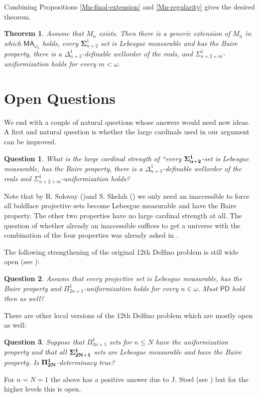\documentclass[a4paper,11pt]{article}
\newtheorem{theorem}{Theorem}[section]
\newtheorem{question}{Question}
\newcommand{\MA}{\mathsf{MA_{\omega_1}}}
\newcommand{\PD}{\mathsf{PD}}
\begin{document}
Combining Propositions \ref{Mn-final-extension} and \ref{Mn-regularity} gives
the desired theorem.

\begin{theorem}
Assume that $M_n$ exists. Then there is a generic extension of $M_n$ in which
$\MA$ holds, every $\boldsymbol{\Sigma}^1_{n+2}$ set is Lebesgue measurable
and has the Baire property, there is a $\Delta^1_{n+3}$-definable wellorder
of the reals, and $\Sigma^1_{n+2+m}$-uniformization holds for every
$m<\omega$.
\end{theorem}

\section{Open Questions}

We end with a couple of natural questions whose answers would need new ideas. A first and natural question is whether the large cardinals used in our argument can be improved. 
\begin{question}
    What is the large cardinal strength of ``every $\bf{\Sigma}^1_{n+2}$-set is Lebesgue measurable, has the Baire property, there is a $\Delta_{n+3}^1$-definable wellorder of the reals and $\Sigma^1_{n+2+m}$-uniformization holds?
\end{question}
Note that by R. Solovay (\cite{solovay1970model})and S. Shelah (\cite{shelah1984can}) we only need an inaccessible to force all boldface projective sets become Lebesgue measurable and have the Baire property. The other two properties have no large cardinal strength at all. The question of whether already an inaccessible suffices to get a universe with the combination of the four properties was already asked in \cite{friedman2003universally}.

The following strengthening of the original 12th Delfino problem is still wide open (see \cite{caicedo2020fourteen}):
\begin{question}
    Assume that every projective set is Lebesgue measurable, has the Baire property and $\Pi^1_{2n+1}$-uniformization holds for every $n \in \omega$. Must $\PD$ hold then as well?
\end{question}

There are other local versions of the 12th Delfino problem which are mostly open as well:
\begin{question}
    Suppose that  $\Pi^1_{2n+1}$ sets for $n \le N$ have the uniformization property and that all $\bf{\Sigma}^1_{2N+1}$ sets are Lebesgue measurable and have the Baire property. Is $\bf{\Pi}^1_{2N}$-determinacy true? 
\end{question}
For $n=N=1$ the above has a positive answer due to J. Steel (see \cite{schindler_delfino}) but for the higher levels this is open.
\end{document}
